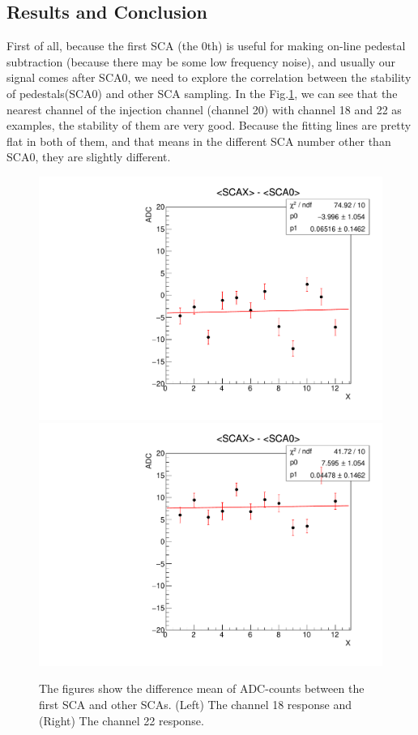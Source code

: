 \subsection{Results and Conclusion}
First of all, because the first SCA (the 0th) is useful for making on-line pedestal subtraction (because there may be some low frequency noise), and usually our signal comes after SCA0, we need to explore the correlation between the stability of pedestals(SCA0) and other SCA sampling.  In the Fig.\ref{fig:PCB_Stability}, we can see that the nearest channel of the injection channel (channel 20) with channel 18 and 22 as examples, the stability of them are very good. Because the fitting lines are pretty flat in both of them, and that means in the different SCA number other than SCA0, they are slightly different. 

\begin{figure}[!htb]
\centering
     \includegraphics[width=\cmsFigWidth]{PCB_study/HG_Chip0_channel18_Subtract_mean_Stability.pdf}
     \includegraphics[width=\cmsFigWidth]{PCB_study/HG_Chip0_channel22_Subtract_mean_Stability.pdf}\\
\caption{The figures show the difference mean of ADC-counts between the first SCA and other SCAs. (Left) The channel 18 response and (Right) The channel 22 response.
}
\label{fig:PCB_Stability}
\end{figure}

